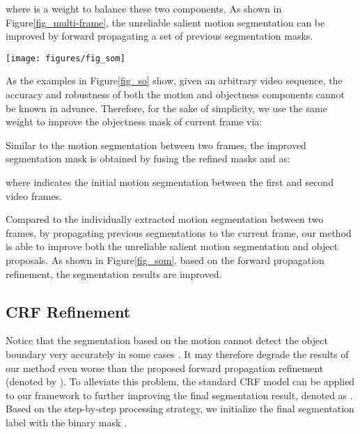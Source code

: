 \documentclass[journal]{IEEEtran}
\makeatletter
\newcommand{\fig}{{Figure}\@\xspace}
\makeatother
\begin{document}
where {\small } is a weight to balance these two components.
As shown in \fig \ref{fig_multi-frame}, the unreliable salient motion segmentation can be improved by forward propagating a set of previous segmentation masks. 

\begin{figure*}[!t]
	\centerline{\texttt{[image: figures/fig\_som]}}
	\caption{Examples of the forward propagation refinement. The first row (video \emph{bear} in DAVIS-2016 dataset \cite{CVPR2016_Perazzi}) shows the improvement for inaccurate salient motion segmentation; and the second row (video \emph{frog} in SegTrack-v2 dataset \cite{ICCV2013_Li}) presents the improvement for unreliable object proposals, respectively.}
	\label{fig_som}
\end{figure*} 
As the examples in \fig \ref{fig_so} show, given an arbitrary video sequence, the accuracy and robustness of both the motion and objectness components cannot be known in advance. Therefore, for the sake of simplicity, we use the same weight {\small } to improve the objectness mask {\small } of current frame via:	


Similar to the motion segmentation between two frames, 
the improved segmentation mask {\small } is obtained by fusing the refined masks {\small } and {\small } as:

where {\small } indicates the initial motion segmentation between the first and second video frames.

Compared to the individually extracted motion segmentation between two frames,
by propagating previous segmentations to the current frame,
our method is able to improve both the unreliable salient motion segmentation and object proposals.
As shown in \fig \ref{fig_som}, based on the forward propagation refinement, the segmentation results are improved.


\subsection{CRF Refinement}
\label{subsec_refine}
Notice that the segmentation based on the motion cannot detect the object boundary very accurately in some cases \cite{ICCV2013_Papazoglou,CVPR2017_Tokmakov}. 
It may therefore degrade the results of our method even worse than the proposed forward propagation refinement (denoted by {\small }). 
To alleviate this problem, the standard CRF model \cite{NIPS2011_Krahenbuhl} can be applied to our framework to further improving the final segmentation result, denoted as {\small }. 
Based on the step-by-step processing strategy, we initialize the final segmentation label {\small } with the binary mask {\small }.
\end{document}

